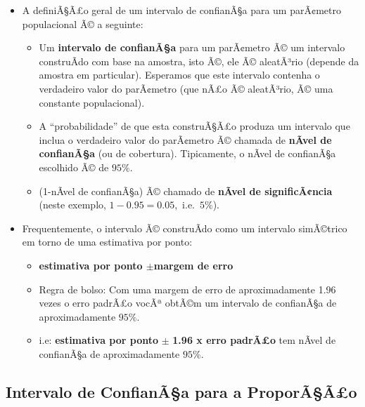 \documentclass[]{article}
\providecommand{\tightlist}{%
  \setlength{\itemsep}{0pt}\setlength{\parskip}{0pt}}
\begin{document}
\begin{itemize}
\tightlist
\item
  A definiÃ§Ã£o geral de um intervalo de confianÃ§a para um parÃ¢metro
  populacional Ã© a seguinte:

  \begin{itemize}
  \tightlist
  \item
    Um \textbf{intervalo de confianÃ§a} para um parÃ¢metro Ã© um
    intervalo construÃ­do com base na amostra, isto Ã©, ele Ã©
    aleatÃ³rio (depende da amostra em particular). Esperamos que este
    intervalo contenha o verdadeiro valor do parÃ¢metro (que nÃ£o Ã©
    aleatÃ³rio, Ã© uma constante populacional).
  \item
    A ``probabilidade'' de que esta construÃ§Ã£o produza um intervalo
    que inclua o verdadeiro valor do parÃ¢metro Ã© chamada de
    \textbf{nÃ­vel de confianÃ§a} (ou de cobertura). Tipicamente, o
    nÃ­vel de confianÃ§a escolhido Ã© de \(95\%\).
  \item
    (1-nÃ­vel de confianÃ§a) Ã© chamado de \textbf{nÃ­vel de
    significÃ¢ncia} (neste exemplo, \(1-0.95=0.05\),~i.e.~\(5\%\)).
  \end{itemize}
\item
  Frequentemente, o intervalo Ã© construÃ­do como um intervalo
  simÃ©trico em torno de uma estimativa por ponto:

  \begin{itemize}
  \tightlist
  \item
    \textbf{estimativa por ponto \(\pm\)margem de erro}
  \item
    Regra de bolso: Com uma margem de erro de aproximadamente 1.96 vezes
    o erro padrÃ£o vocÃª obtÃ©m um intervalo de confianÃ§a de
    aproximadamente \(95\%\).
  \item
    i.e: \textbf{estimativa por ponto} \(\pm\) \textbf{1.96 x erro
    padrÃ£o} tem nÃ­vel de confianÃ§a de aproximadamente \(95\%\).
  \end{itemize}
\end{itemize}

\subsection{Intervalo de ConfianÃ§a para a
ProporÃ§Ã£o}\label{intervalo-de-confianaa-para-a-proporaao}
\end{document}
